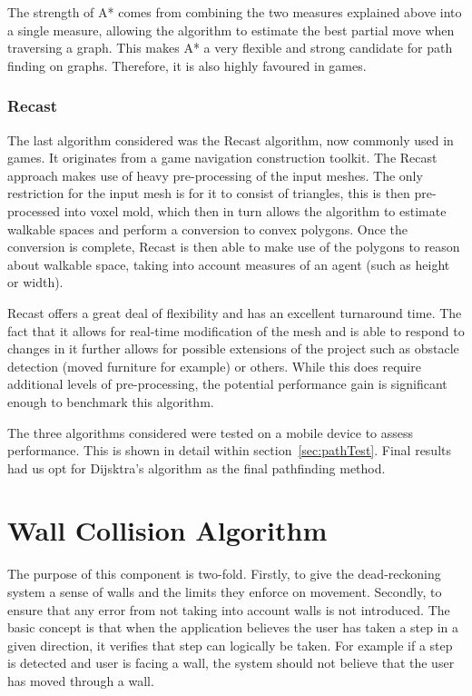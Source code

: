 \documentclass[12pt,a4paper]{report}
\begin{document}
The strength of A* comes from combining the two measures explained above into a single measure, allowing the algorithm to estimate the best partial move when traversing a graph. This makes A* a very flexible and strong candidate for path finding on graphs. Therefore, it is also highly favoured in games.

\subsubsection{Recast}
The last algorithm considered was the Recast\cite{libRecast} algorithm, now commonly used in games. It originates from a game navigation construction toolkit. The Recast approach makes use of heavy pre-processing of the input meshes. The only restriction for the input mesh is for it to consist of triangles, this is then pre-processed into voxel mold, which then in turn allows the algorithm to estimate walkable spaces and perform a conversion to convex polygons. Once the conversion is complete, Recast is then able to make use of the polygons to reason about walkable space, taking into account measures of an agent (such as height or width).

Recast offers a great deal of flexibility and has an excellent turnaround time. The fact that it allows for real-time modification of the mesh and is able to respond to changes in it further allows for possible extensions of the project such as obstacle detection (moved furniture for example) or others. While this does require additional levels of pre-processing, the potential performance gain is significant enough to benchmark this algorithm.

The three algorithms considered were tested on a mobile device to assess performance. This is shown in detail within section~\ref{sec:pathTest}. Final results had us opt for Dijsktra's algorithm as the final pathfinding method.

\section{Wall Collision Algorithm}

The purpose of this component is two-fold. Firstly, to give the dead-reckoning system a sense of walls and the limits they enforce on movement. Secondly, to ensure that any error from not taking into account walls is not introduced. The basic concept is that when the application believes the user has taken a step in a given direction, it verifies that step can logically be taken. For example if a step is detected and user is facing a wall, the system should not believe that the user has moved through a wall.
\end{document}
